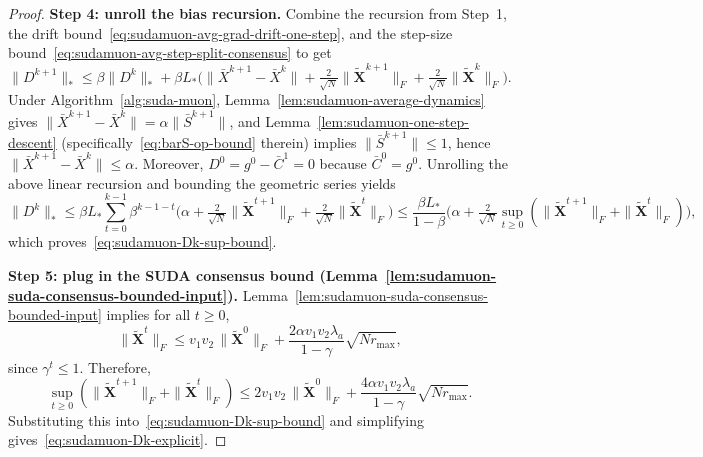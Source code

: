 \documentclass{article}
\begin{document}
\begin{proof}
\medskip\noindent\textbf{Step 4: unroll the bias recursion.}
Combine the recursion from Step~1, the drift bound~\eqref{eq:sudamuon-avg-grad-drift-one-step}, and the step-size bound~\eqref{eq:sudamuon-avg-step-split-consensus} to get
\[
\|D^{k+1}\|_*
\le \beta\|D^k\|_* + \beta L_*\Big(\|\bar X^{k+1}-\bar X^k\| + \tfrac{2}{\sqrt N}\|\tilde{\mathbf X}^{k+1}\|_F + \tfrac{2}{\sqrt N}\|\tilde{\mathbf X}^{k}\|_F\Big).
\]
Under Algorithm~\ref{alg:suda-muon}, Lemma~\ref{lem:sudamuon-average-dynamics} gives
$\|\bar X^{k+1}-\bar X^k\|=\alpha\|\bar S^{k+1}\|$, and Lemma~\ref{lem:sudamuon-one-step-descent} (specifically~\eqref{eq:barS-op-bound} therein) implies $\|\bar S^{k+1}\|\le 1$, hence $\|\bar X^{k+1}-\bar X^k\|\le \alpha$.
Moreover, $D^0=g^0-\bar C^1=0$ because $\bar C^0=g^0$.
Unrolling the above linear recursion and bounding the geometric series yields
\[
\|D^k\|_*
\le \beta L_*\sum_{t=0}^{k-1}\beta^{k-1-t}
\Big(\alpha + \tfrac{2}{\sqrt N}\|\tilde{\mathbf X}^{t+1}\|_F + \tfrac{2}{\sqrt N}\|\tilde{\mathbf X}^{t}\|_F\Big)
\le
\frac{\beta L_*}{1-\beta}
\Big(\alpha + \tfrac{2}{\sqrt N}\sup_{t\ge 0}(\|\tilde{\mathbf X}^{t+1}\|_F+\|\tilde{\mathbf X}^{t}\|_F)\Big),
\]
which proves~\eqref{eq:sudamuon-Dk-sup-bound}.

\medskip\noindent\textbf{Step 5: plug in the SUDA consensus bound (Lemma~\ref{lem:sudamuon-suda-consensus-bounded-input}).}
Lemma~\ref{lem:sudamuon-suda-consensus-bounded-input} implies for all $t\ge 0$,
\[
\|\tilde{\mathbf X}^t\|_F
\le v_1v_2\,\|\tilde{\mathbf X}^0\|_F + \frac{2\alpha v_1v_2\lambda_a}{1-\gamma}\sqrt{Nr_{\max}},
\]
since $\gamma^t\le 1$.
Therefore,
\[
\sup_{t\ge 0}(\|\tilde{\mathbf X}^{t+1}\|_F+\|\tilde{\mathbf X}^{t}\|_F)
\le 2v_1v_2\,\|\tilde{\mathbf X}^0\|_F + \frac{4\alpha v_1v_2\lambda_a}{1-\gamma}\sqrt{Nr_{\max}}.
\]
Substituting this into~\eqref{eq:sudamuon-Dk-sup-bound} and simplifying gives~\eqref{eq:sudamuon-Dk-explicit}.
\end{proof}
\end{document}
